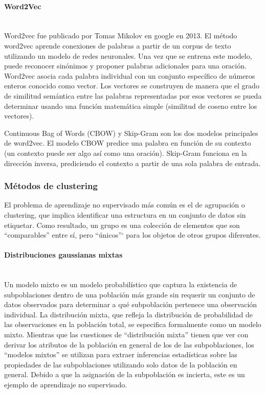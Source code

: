 \documentclass[12pt]{article}
\newcommand{\subsubsubsection}[1]{\paragraph{#1}\mbox{}\\}
\begin{document}
				\subsubsubsection{Word2Vec}
				Word2vec fue publicado por Tomas Mikolov en google en 2013. El método word2vec aprende conexiones de palabras a partir de un corpus de texto utilizando un modelo de redes neuronales. Una vez que se entrena este modelo, puede reconocer sinónimos y proponer palabras adicionales para una oración. Word2vec asocia cada palabra individual con un conjunto específico de números enteros conocido como vector. Los vectores se construyen de manera que el grado de similitud semántica entre las palabras representadas por esos vectores se pueda determinar usando una función matemática simple (similitud de coseno entre los vectores). \cite{Jain2020}
				
				Continuous Bag of Words (CBOW) y Skip-Gram son los dos modelos principales de word2vec. El modelo CBOW predice una palabra en función de su contexto (un contexto puede ser algo así como una oración). Skip-Gram funciona en la dirección inversa, prediciendo el contexto a partir de una sola palabra de entrada.\cite{Meyer2016}
				
			\subsubsection{Métodos de clustering}
			El problema de aprendizaje no supervisado más común es el de agrupación o clustering, que implica identificar una estructura en un conjunto de datos sin etiquetar. Como resultado, un grupo es una colección de elementos que son ``comparables'' entre sí, pero ``únicos''` para los objetos de otros grupos diferentes.\cite{Madhulatha2012}
							
				\subsubsubsection{Distribuciones gaussianas mixtas}
				Un modelo mixto es un modelo probabilístico que captura la existencia de subpoblaciones dentro de una población más grande sin requerir un conjunto de datos observados para determinar a qué subpoblación pertenece una observación individual. La distribución mixta, que refleja la distribución de probabilidad de las observaciones en la población total, se especifica formalmente como un modelo mixto. Mientras que las cuestiones de ``distribución mixta'' tienen que ver con derivar los atributos de la población en general de los de las subpoblaciones, los ``modelos mixtos'' se utilizan para extraer inferencias estadísticas sobre las propiedades de las subpoblaciones utilizando solo datos de la población en general. Debido a que la asignación de la subpoblación es incierta, este es un ejemplo de aprendizaje no supervisado. \cite{Elmahdy2013}
								
\end{document}
